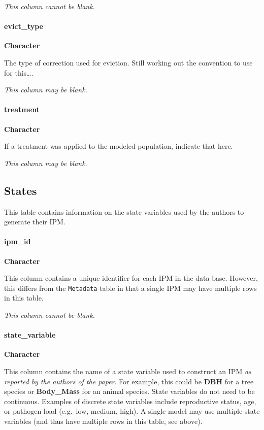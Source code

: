 \documentclass[]{article}
\let\oldparagraph\paragraph
\renewcommand{\paragraph}[1]{\oldparagraph{#1}\mbox{}}
\begin{document}
\emph{This column cannot be blank.}

\paragraph{evict\_type}\label{evict_type}

\textbf{Character}

The type of correction used for eviction. Still working out the
convention to use for this\ldots{}.

\emph{This column may be blank.}

\paragraph{treatment}\label{treatment}

\textbf{Character}

If a treatment was applied to the modeled population, indicate that
here.

\emph{This column may be blank}.

\subsection{States}\label{states}

This table contains information on the state variables used by the
authors to generate their IPM.

\paragraph{ipm\_id}\label{ipm_id-1}

\textbf{Character}

This column contains a unique identifier for each IPM in the data base.
However, this differs from the \texttt{Metadata} table in that a single
IPM may have multiple rows in this table.

\emph{This column cannot be blank.}

\paragraph{state\_variable}\label{state_variable}

\textbf{Character}

This column contains the name of a state variable used to construct an
IPM \emph{as reported by the authors of the paper}. For example, this
could be \textbf{DBH} for a tree species or \textbf{Body\_Mass} for an
animal species. State variables do not need to be continuous. Examples
of discrete state variables include reproductive status, age, or
pathogen load (e.g.~low, medium, high). A single model may use multiple
state variables (and thus have multiple rows in this table, see above).
\end{document}
